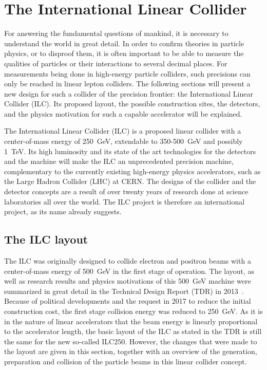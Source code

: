 \chapter{The International Linear Collider}
\label{ILC}
\begin{chapterabstract}
For answering the fundamental questions of mankind, it is necessary to understand the world in great detail.
In order to confirm theories in particle physics, or to disproof them, it is often important to be able to measure the qualities of particles or their interactions to several decimal places.
For measurements being done in high-energy particle colliders, such precisions can only be reached in linear lepton colliders.
The following sections will present a new design for such a collider of the precision frontier: the International Linear Collider (ILC). 
Its proposed layout, the possible construction sites, the detectors, and the physics motivation for such a capable accelerator will be explained.
\end{chapterabstract}
\newline

The International Linear Collider (ILC) is a proposed linear \positron\electron collider with a center-of-mass energy of \SI{250}{\GeV}, extendable to 350-\SI{500}{\GeV} and possibly \SI{1}{\TeV}.
Its high luminosity and its state of the art technologies for the detectors and the machine will make the ILC an unprecedented precision machine, complementary to the currently existing high-energy physics accelerators, such as the Large Hadron Collider (LHC) at CERN.
The designs of the collider and the detector concepts are a result of over twenty years of research done at science laboratories all over the world.
The ILC project is therefore an international project, as its name already suggests.

\section{The ILC layout}
\label{ILC:layout}
The ILC was originally designed to collide electron and positron beams with a center-of-mass energy of \SI{500}{\GeV} in the first stage of operation.
The layout, as well as research results and physics motivations of this \SI{500}{\GeV} machine were summarized in great detail in the Technical Design Report (TDR) in 2013~\cite{TDR}.
Because of political developments and the request in 2017 to reduce the initial construction cost, the first stage collision energy was reduced to \SI{250}{\GeV}.
As it is in the nature of linear accelerators that the beam energy is linearly proportional to the accelerator length, the basic layout of the ILC as stated in the TDR is still the same for the new so-called ILC250.
However, the changes that were made to the layout are given in this section, together with an overview of the generation, preparation and collision of the particle beams in this linear collider concept.


